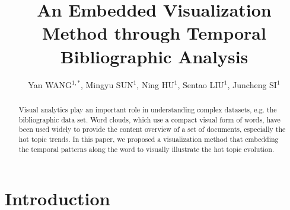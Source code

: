 \documentclass[12pt]{iopart}
\begin{document}
\title[An Embedded Visualization Method through Temporal Bibliographic Analysis]{An Embedded Visualization Method through Temporal Bibliographic Analysis}

\author{Yan WANG$^{1,*}$, Mingyu SUN$^1$, Ning HU$^1$, Sentao LIU$^1$, Juncheng SI$^1$}

\address{$^1$ State Grid Shandong DongYing Electric Power Company, DongYing 257091, Shandong Province, China}
\vspace{10pt}

\begin{abstract}
Visual analytics play an important role in understanding complex datasets, e.g. the bibliographic data set. Word clouds, which use a compact visual form of words, have been used widely to provide the content overview of a set of documents, especially the hot topic trends. In this paper, we proposed a visualization method that embedding the temporal patterns along the word to visually illustrate the hot topic evolution. 
\end{abstract}


%
%
%
% 
%



\section{Introduction}
\end{document}
